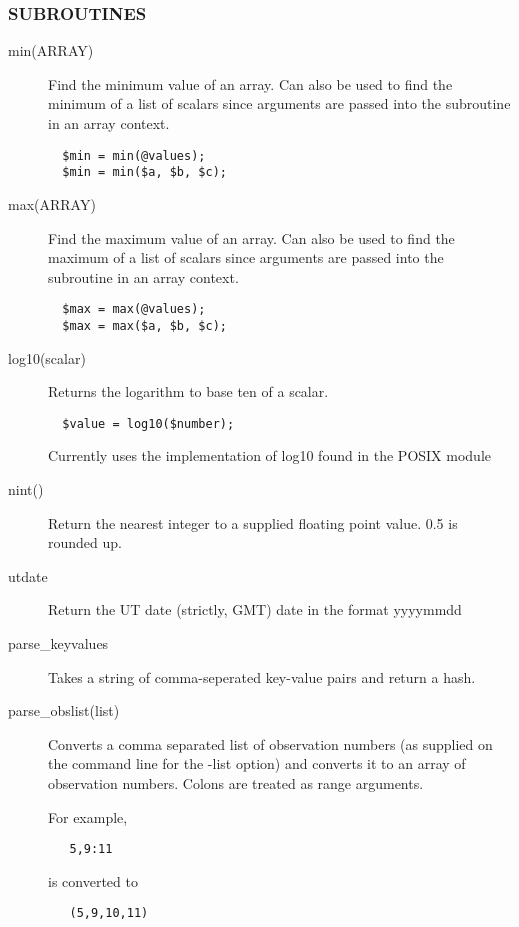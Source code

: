 \subsubsection*{SUBROUTINES\label{ORAC::General_SUBROUTINES}}\begin{description}
\item[min(ARRAY)] \mbox{}

Find the minimum value of an array. Can also be used to find
the minimum of a list of scalars since arguments are passed into
the subroutine in an array context.

\begin{verbatim}
  $min = min(@values);
  $min = min($a, $b, $c);
\end{verbatim}
\item[max(ARRAY)] \mbox{}

Find the maximum value of an array. Can also be used to find
the maximum of a list of scalars since arguments are passed into
the subroutine in an array context.

\begin{verbatim}
  $max = max(@values);
  $max = max($a, $b, $c);
\end{verbatim}
\item[log10(scalar)] \mbox{}

Returns the logarithm to base ten of a scalar.

\begin{verbatim}
  $value = log10($number);
\end{verbatim}


Currently uses the implementation of log10 found in the
POSIX module

\item[nint()] \mbox{}

Return the nearest integer to a supplied floating point
value. 0.5 is rounded up.

\item[utdate] \mbox{}

Return the UT date (strictly, GMT) date in the format yyyymmdd

\item[parse\_keyvalues] \mbox{}

Takes a string of comma-seperated key-value pairs and return a hash.

\item[parse\_obslist(list)] \mbox{}

Converts a comma separated list of observation numbers (as supplied
on the command line for the -list option) and converts it to
an array of observation numbers. Colons are treated as range arguments.



For example,

\begin{verbatim}
   5,9:11
\end{verbatim}


is converted to

\begin{verbatim}
   (5,9,10,11)
\end{verbatim}
\end{description}


